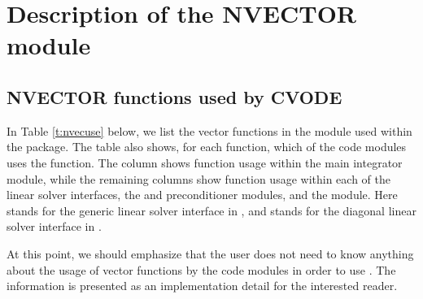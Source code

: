 \chapter{Description of the NVECTOR module}\label{s:nvector}



\section{NVECTOR functions used by CVODE}

In Table \ref{t:nvecuse} below, we list the vector functions in the 
{\nvector} module used within the {\cvode} package.
The table also shows, for each function, which of the code modules uses
the function. The {\cvode} column shows function usage within the main
integrator module, while the remaining columns show function usage
within each of the {\cvode} linear solver interfaces, the {\cvbandpre} and
{\cvbbdpre} preconditioner modules, and the {\fcvode} module.  Here
{\cvls} stands for the generic linear solver interface in {\cvode},
and {\cvdiag} stands for the diagonal linear solver interface in {\cvode}.

At this point, we should emphasize that the {\cvode} user does not need to know 
anything about the usage of vector functions by the {\cvode} code modules in order 
to use {\cvode}. The information is presented as an implementation detail for the 
interested reader.

